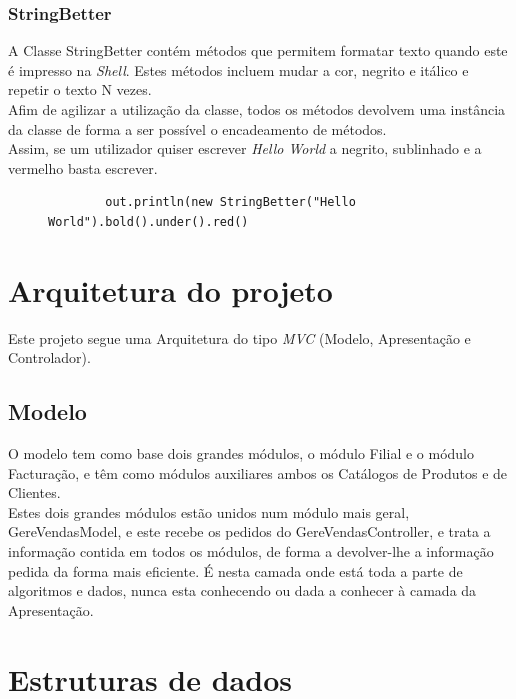\documentclass[a4paper]{report}
\begin{document}
\subsection{StringBetter}

A Classe StringBetter contém métodos que permitem formatar texto quando este é impresso na
\textit{Shell}. Estes métodos incluem mudar a cor, negrito e itálico e repetir o texto N vezes.\\
Afim de agilizar a utilização da classe, todos os métodos devolvem uma instância da classe
de forma a ser possível o encadeamento de métodos.\\
Assim, se um utilizador quiser escrever \textit{Hello World} a negrito, sublinhado e a
vermelho basta escrever.
\begin{figure}[H]
    \begin{center}
        \begin{verbatim}
        out.println(new StringBetter("Hello World").bold().under().red()
        \end{verbatim}
    \end{center}
\end{figure}

\chapter{Arquitetura do projeto}

Este projeto segue uma Arquitetura do tipo \textit{MVC} (Modelo, Apresentação e
Controlador).

\section{Modelo}

O modelo tem como base dois grandes módulos, o módulo Filial e o módulo Facturação,
e têm como módulos auxiliares ambos os Catálogos de Produtos e de Clientes.\\
Estes dois grandes módulos estão unidos num módulo mais geral, GereVendasModel, e este recebe
os pedidos do GereVendasController, e trata a informação contida em todos os módulos, de 
forma a devolver-lhe a informação pedida da forma mais eficiente. É nesta camada
onde está toda a parte de algoritmos e dados, nunca esta conhecendo ou dada a
conhecer à camada da Apresentação.

\chapter{Estruturas de dados}
\end{document}
